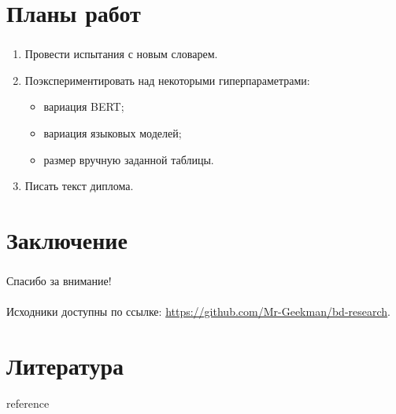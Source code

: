 \documentclass[t]{beamer}  %
\begin{document}
\section{Планы работ}
\begin{frame}
	\frametitle{\insertsection} 
	\framesubtitle{\insertsubsection}
	\begin{enumerate}
		\item Провести испытания с новым словарем.
		\item Поэкспериментировать над некоторыми гиперпараметрами:
			\begin{itemize}
				\item вариация BERT;
				\item вариация языковых моделей;
				\item размер вручную заданной таблицы.
			\end{itemize}
		\item Писать текст диплома.
	\end{enumerate}
\end{frame}

\section{Заключение}
\begin{frame}
	\frametitle{\insertsection} 
	Спасибо за внимание!\\~\\
	
	Исходники доступны по ссылке: \url{https://github.com/Mr-Geekman/bd-research}.
\end{frame}

\section{Литература}
\begin{frame}[allowframebreaks]{reference}
	\frametitle{\insertsection} 
	\printbibliography
\end{frame}
\end{document}
